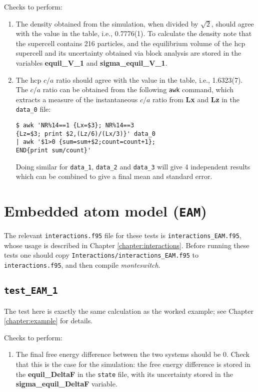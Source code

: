 \documentclass{report}
\begin{document}
Checks to perform:
\begin{enumerate}
\item
The density obtained from the simulation, when divided by $\sqrt{2}$, should agree with the value in the table,
i.e., 0.7776(1). To calculate the density note that the supercell contains 216 particles, and the equilibrium
volume of the hcp supercell and its uncertainty obtained via block analysis are stored in the variables
\textbf{equil\_V\_1} and \textbf{sigma\_equil\_V\_1}.
\item
The hcp $c/a$ ratio should agree with the value in the table, i.e., 1.6323(7). The $c/a$ ratio can be obtained from
the following \texttt{awk} command, which extracts a measure of the instantaneous $c/a$ ratio from \textbf{Lx} and \textbf{Lz} in the
\texttt{data\_0} file:
\begin{verbatim}
$ awk 'NR%14==1 {Lx=$3}; NR%14==3 
{Lz=$3; print $2,(Lz/6)/(Lx/3)}' data_0 
| awk '$1>0 {sum=sum+$2;count=count+1}; 
END{print sum/count}'
\end{verbatim}
Doing similar for \texttt{data\_1}, \texttt{data\_2} and \texttt{data\_3} will give 4 independent results which can be combined
to give a final mean and standard error.
\end{enumerate}


\section{Embedded atom model (\texttt{EAM})}
The relevant \texttt{interactions.f95} file for these tests is \texttt{interactions\_EAM.f95}, whose usage is described in Chapter
\ref{chapter:interactions}. Before running these tests one should copy \texttt{Interactions/interactions\_EAM.f95}
to \texttt{interactions.f95}, and then compile \emph{monteswitch}.


\subsection{\texttt{test\_EAM\_1}}
The test here is exactly the same calculation as the worked example; see Chapter \ref{chapter:example} for details.

Checks to perform:
\begin{enumerate}
\item
The final free energy difference between the two systems should be 0. Check that this is the case for the
simulation: the free energy difference is stored in the \textbf{equil\_DeltaF} in the \texttt{state} file, with its uncertainty
stored in the \textbf{sigma\_equil\_DeltaF} variable.
\end{enumerate}
\end{document}

